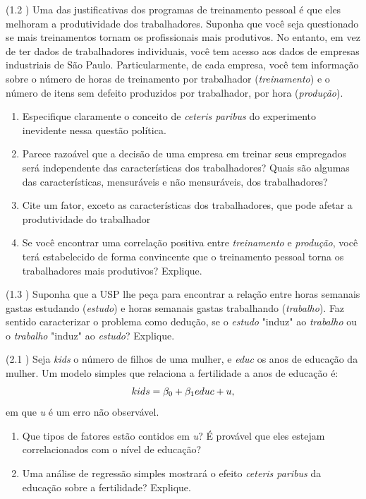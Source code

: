 \documentclass[12pt,letterpaper, onecolumn]{exam}
\begin{document}
\begin{questions}

    \question (1.2 \citep{wooldridge2016}) Uma das justificativas dos programas de treinamento pessoal é que eles melhoram a produtividade dos trabalhadores. Suponha que você seja questionado se mais treinamentos tornam os profissionais mais produtivos. No entanto, em vez de ter dados de trabalhadores individuais, você tem acesso aos dados de empresas industriais de São Paulo. Particularmente, de cada empresa, você tem informação sobre o número de horas de treinamento por trabalhador (\textit{treinamento}) e o número de itens sem defeito produzidos por trabalhador, por hora (\textit{produção}).
    \begin{enumerate}[label=(\alph*)]
    \item Especifique claramente o conceito de \textit{ceteris paribus} do experimento inevidente nessa questão política.
    \item Parece razoável que a decisão de uma empresa em treinar seus empregados será independente das características dos trabalhadores? Quais são algumas das características, mensuráveis e não mensuráveis, dos trabalhadores?
    \item Cite um fator, exceto as características dos trabalhadores, que pode afetar a produtividade do trabalhador
    \item Se você encontrar uma correlação positiva entre \textit{treinamento} e \textit{produção}, você terá estabelecido de forma convincente que o treinamento pessoal torna os trabalhadores mais produtivos? Explique.
    \end{enumerate}


    
    \question (1.3 \citep{wooldridge2016}) Suponha que a USP lhe peça para encontrar a relação entre horas semanais gastas estudando (\textit{estudo}) e horas semanais gastas trabalhando (\textit{trabalho}). Faz sentido caracterizar o problema como dedução, se o \textit{estudo} "induz" ao \textit{trabalho} ou o \textit{trabalho} "induz" ao \textit{estudo}? Explique.



    \question (2.1 \citep{wooldridge2016}) Seja \textit{kids} o número de filhos de uma mulher, e \textit{educ} os anos de educação da mulher. Um modelo simples que relaciona a fertilidade a anos de educação é:\begin{equation*}
        kids = \beta_0 + \beta_1educ + u \\ \text{,}
    \end{equation*} em que \textit{u} é um erro não observável.
    \begin{enumerate} [label = (\alph*)]
        \item Que tipos de fatores estão contidos em \textit{u}? É provável que eles estejam correlacionados com o nível de educação?
        \item Uma análise de regressão simples mostrará o efeito \textit{ceteris paribus} da educação sobre a fertilidade? Explique.
    \end{enumerate}



\end{questions}
\end{document}
